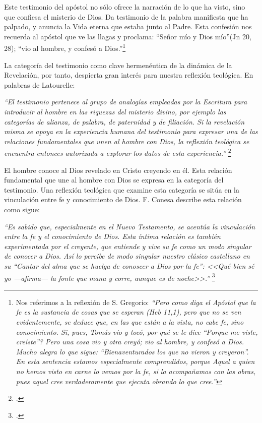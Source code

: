 \documentclass[11pt]{article}
\begin{document}
Este testimonio del apóstol no sólo ofrece la narración de lo que ha visto, sino que confiesa el misterio de Dios. Da testimonio de la palabra manifiesta que ha palpado, y anuncia la Vida eterna que estaba junto al Padre. Esta confesión nos recuerda al apóstol que ve las llagas y proclama: ``Señor mío y Dios mío''(Jn 20, 28); ``vio al hombre, y confesó a Dios.''\footnote{Nos referimos a la reflexión de S. Gregorio: \emph{``Pero como diga el Apóstol que la fe es la sustancia de cosas que se esperan (Heb 11,1), pero que no se ven evidentemente, se deduce que, en las que están a la vista, no cabe fe, sino conocimiento. Si, pues, Tomás vio y tocó, \textquestiondown{}por qué se le dice ``Porque me viste, creíste''? Pero una cosa vio y otra creyó; vio al hombre, y confesó a Dios. Mucho alegra lo que sigue: ``Bienaventurados los que no vieron y creyeron''. En esta sentencia estamos especialmente comprendidos, porque Aquel a quien no hemos visto en carne lo vemos por la fe, si la acompañamos con las obras, pues aquel cree verdaderamente que ejecuta obrando lo que cree.''}\cite[Homilía 26]{greg}
}

La categoría del testimonio como clave hermenéutica de la dinámica de la Revelación, por tanto, despierta gran interés para nuestra reflexión teológica. En palabras de Latourelle:

\emph{
``El testimonio pertenece al grupo de analogías empleadas por la Escritura para introducir al hombre en las riquezas del misterio divino, por ejemplo las categorías de alianza, de palabra, de paternidad y de filiación. Si la revelación misma se apoya en la experiencia humana del testimonio para expresar una de las relaciones fundamentales que unen al hombre con Dios, la reflexión teológica se encuentra entonces autorizada a explorar los datos de esta experiencia.''
}\footcite[1523]{dicctf}

El hombre conoce al Dios revelado en Cristo creyendo en él. Esta relación fundamental que une al hombre con Dios se expresa en la categoría del testimonio. Una reflexión teológica que examine esta categoría se sitúa en la vinculación entre fe y conocimiento de Dios. F. Conesa describe esta relación como sigue:

\emph{
``Es sabido que, especialmente en el Nuevo Testamento, se acentúa la vinculación entre la fe y el conocimiento de Dios. Esta íntima relación es también experimentada por el creyente, que entiende y vive su fe como un modo singular de conocer a Dios. Así lo percibe de modo singular nuestro clásico castellano en su ``Cantar del alma que se huelga de conoscer a Dios por la fe'': <<Qué bien sé yo ---afirma--- la fonte que mana y corre, aunque es de noche>>.''
}\footcite[15]{cyc}
\end{document}
